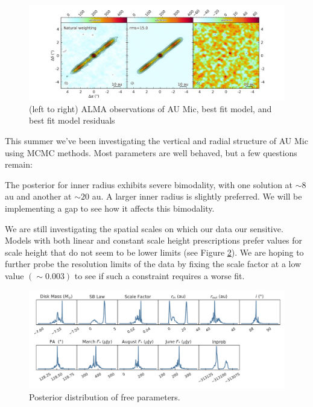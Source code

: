 \documentclass[12pt,modern]{article}
\begin{document}
\begin{figure}
  \includegraphics[width=\linewidth]{run6_bestfit_global_concise}
  \caption{(left to right) ALMA observations of AU Mic, best fit model, and best fit model residuals}
  \label{fig:bf}
\end{figure}

This summer we've been investigating the vertical and radial structure of AU Mic using MCMC methods. 
Most parameters are well behaved, but a few questions remain:
  
The posterior for inner radius exhibits severe bimodality, with one solution at $\sim 8$ au and another at $\sim 20$ au. 
A larger inner radius is slightly preferred.
We will be implementing a gap to see how it affects this bimodality.
  
We are still investigating the spatial scales on which our data our sensitive. 
Models with both linear and constant scale height prescriptions prefer values for scale height that do not seem to be lower limits (see Figure \ref{fig:kde}).
We are hoping to further probe the resolution limits of the data by fixing the scale factor at a low value $(\sim 0.003)$ to see if such a constraint requires a worse fit.

\begin{figure}[h]
  \centering
  \includegraphics[width=\linewidth]{run6_kde}
  \caption{Posterior distribution of free parameters.}
  \label{fig:kde}
\end{figure}
\end{document}
